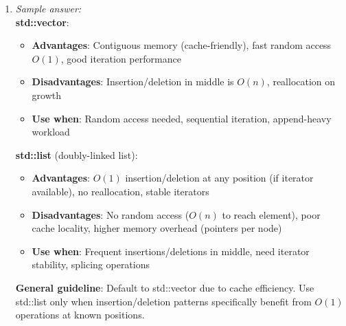 \documentclass[11pt]{article}
\begin{document}
\begin{enumerate}[label=\textbf{\arabic*.}]
  \item \emph{Sample answer:}\\
  \textbf{std::vector}:
  \begin{itemize}
    \item \textbf{Advantages}: Contiguous memory (cache-friendly), fast random access $O(1)$, 
    good iteration performance
    \item \textbf{Disadvantages}: Insertion/deletion in middle is $O(n)$, reallocation on growth
    \item \textbf{Use when}: Random access needed, sequential iteration, append-heavy workload
  \end{itemize}

  \textbf{std::list} (doubly-linked list):
  \begin{itemize}
    \item \textbf{Advantages}: $O(1)$ insertion/deletion at any position (if iterator available), 
    no reallocation, stable iterators
    \item \textbf{Disadvantages}: No random access ($O(n)$ to reach element), poor cache locality, 
    higher memory overhead (pointers per node)
    \item \textbf{Use when}: Frequent insertions/deletions in middle, need iterator stability, 
    splicing operations
  \end{itemize}

  \textbf{General guideline}: Default to std::vector due to cache efficiency. Use std::list only 
  when insertion/deletion patterns specifically benefit from $O(1)$ operations at known positions.

\end{enumerate}
\end{document}
